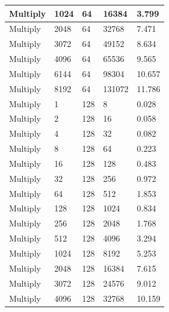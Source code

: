 \documentclass{article}
\begin{document}
\begin{longtable}{|l|l|l|l|l|}
Multiply           & 1024 & 64          & 16384             & 3.799             \\ \hline
Multiply           & 2048 & 64          & 32768             & 7.471             \\ \hline
Multiply           & 3072 & 64          & 49152             & 8.634             \\ \hline
Multiply           & 4096 & 64          & 65536             & 9.565             \\ \hline
Multiply           & 6144 & 64          & 98304             & 10.657            \\ \hline
Multiply           & 8192 & 64          & 131072            & 11.786            \\ \hline
Multiply           & 1    & 128         & 8                 & 0.028             \\ \hline
Multiply           & 2    & 128         & 16                & 0.058             \\ \hline
Multiply           & 4    & 128         & 32                & 0.082             \\ \hline
Multiply           & 8    & 128         & 64                & 0.223             \\ \hline
Multiply           & 16   & 128         & 128               & 0.483             \\ \hline
Multiply           & 32   & 128         & 256               & 0.972             \\ \hline
Multiply           & 64   & 128         & 512               & 1.853             \\ \hline
Multiply           & 128  & 128         & 1024              & 0.834             \\ \hline
Multiply           & 256  & 128         & 2048              & 1.768             \\ \hline
Multiply           & 512  & 128         & 4096              & 3.294             \\ \hline
Multiply           & 1024 & 128         & 8192              & 5.253             \\ \hline
Multiply           & 2048 & 128         & 16384             & 7.615             \\ \hline
Multiply           & 3072 & 128         & 24576             & 9.012             \\ \hline
Multiply           & 4096 & 128         & 32768             & 10.159            \\ \hline

\end{longtable}
\end{document}
